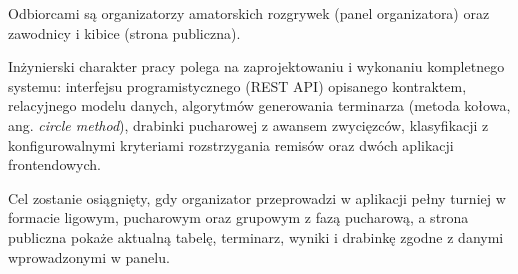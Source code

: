 \documentclass[11pt,a4paper,oneside]{article}
\begin{document}
Odbiorcami są organizatorzy amatorskich rozgrywek (panel organizatora) oraz zawodnicy i kibice (strona publiczna).

Inżynierski charakter pracy polega na zaprojektowaniu i wykonaniu kompletnego systemu: interfejsu programistycznego (REST API) opisanego kontraktem, relacyjnego modelu danych, algorytmów generowania terminarza (metoda kołowa, ang. \emph{circle method}), drabinki pucharowej z awansem zwycięzców, klasyfikacji z konfigurowalnymi kryteriami rozstrzygania remisów oraz dwóch aplikacji frontendowych.

Cel zostanie osiągnięty, gdy organizator przeprowadzi w aplikacji pełny turniej w formacie ligowym, pucharowym oraz grupowym z fazą pucharową, a strona publiczna pokaże aktualną tabelę, terminarz, wyniki i drabinkę zgodne z danymi wprowadzonymi w panelu.
\end{document}
